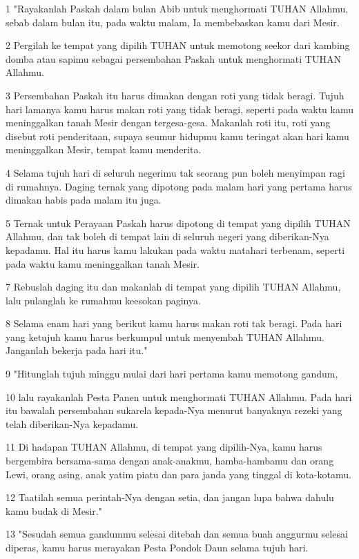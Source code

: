 \par 1 "Rayakanlah Paskah dalam bulan Abib untuk menghormati TUHAN Allahmu, sebab dalam bulan itu, pada waktu malam, Ia membebaskan kamu dari Mesir.
\par 2 Pergilah ke tempat yang dipilih TUHAN untuk memotong seekor dari kambing domba atau sapimu sebagai persembahan Paskah untuk menghormati TUHAN Allahmu.
\par 3 Persembahan Paskah itu harus dimakan dengan roti yang tidak beragi. Tujuh hari lamanya kamu harus makan roti yang tidak beragi, seperti pada waktu kamu meninggalkan tanah Mesir dengan tergesa-gesa. Makanlah roti itu, roti yang disebut roti penderitaan, supaya seumur hidupmu kamu teringat akan hari kamu meninggalkan Mesir, tempat kamu menderita.
\par 4 Selama tujuh hari di seluruh negerimu tak seorang pun boleh menyimpan ragi di rumahnya. Daging ternak yang dipotong pada malam hari yang pertama harus dimakan habis pada malam itu juga.
\par 5 Ternak untuk Perayaan Paskah harus dipotong di tempat yang dipilih TUHAN Allahmu, dan tak boleh di tempat lain di seluruh negeri yang diberikan-Nya kepadamu. Hal itu harus kamu lakukan pada waktu matahari terbenam, seperti pada waktu kamu meninggalkan tanah Mesir.
\par 7 Rebuslah daging itu dan makanlah di tempat yang dipilih TUHAN Allahmu, lalu pulanglah ke rumahmu keesokan paginya.
\par 8 Selama enam hari yang berikut kamu harus makan roti tak beragi. Pada hari yang ketujuh kamu harus berkumpul untuk menyembah TUHAN Allahmu. Janganlah bekerja pada hari itu."
\par 9 "Hitunglah tujuh minggu mulai dari hari pertama kamu memotong gandum,
\par 10 lalu rayakanlah Pesta Panen untuk menghormati TUHAN Allahmu. Pada hari itu bawalah persembahan sukarela kepada-Nya menurut banyaknya rezeki yang telah diberikan-Nya kepadamu.
\par 11 Di hadapan TUHAN Allahmu, di tempat yang dipilih-Nya, kamu harus bergembira bersama-sama dengan anak-anakmu, hamba-hambamu dan orang Lewi, orang asing, anak yatim piatu dan para janda yang tinggal di kota-kotamu.
\par 12 Taatilah semua perintah-Nya dengan setia, dan jangan lupa bahwa dahulu kamu budak di Mesir."
\par 13 "Sesudah semua gandummu selesai ditebah dan semua buah anggurmu selesai diperas, kamu harus merayakan Pesta Pondok Daun selama tujuh hari.
